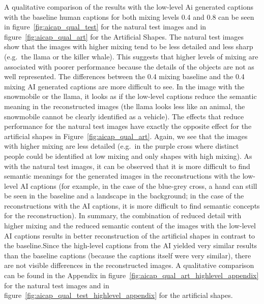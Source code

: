 A qualitative comparison of the results with the low-level Ai generated captions with the baseline human captions for both mixing levels 0.4 and 0.8 can be seen in figure~\ref{fig:aicap_qual_test} for the natural test images and in figure~\ref{fig:aicap_qual_art} for the Artificial Shapes. The natural test images show that the images with higher mixing tend to be less detailed and less sharp (e.g.\ the llama or the killer whale). This suggests that higher levels of mixing are associated with poorer performance because the details of the objects are not as well represented. The differences between the 0.4 mixing baseline and the 0.4 mixing AI generated captions are more difficult to see. In the image with the snowmobile or the llama, it looks as if the low-level captions reduce the semantic meaning in the reconstructed images (the llama looks less like an animal, the snowmobile cannot be clearly identified as a vehicle). The effects that reduce performance for the natural test images have exactly the opposite effect for the artificial shapes in Figure~\ref{fig:aicap_qual_art}. Again, we see that the images with higher mixing are less detailed (e.g.\ in the purple cross where distinct people could be identified at low mixing and only shapes with high mixing). As with the natural test images, it can be observed that it is more difficult to find semantic meanings for the generated images in the reconstructions with the low-level AI captions (for example, in the case of the blue-grey cross, a hand can still be seen in the baseline and a landscape in the background; in the case of the reconstructions with the AI captions, it is more difficult to find semantic concepts for the reconstruction). In summary, the combination of reduced detail with higher mixing and the reduced semantic content of the images with the low-level AI captions results in better reconstruction of the artificial shapes in contrast to the baseline.Since the high-level captions from the AI yielded very similar results than the baseline captions (because the captions itself were very similar), there are not visible differences in the reconstructed images. A qualitative comparison can be found in the Appendix in figure~\ref{fig:aicap_qual_art_highlevel_appendix} for the natural test images and in figure~\ref{fig:aicap_qual_test_highlevel_appendix} for the artificial shapes.


